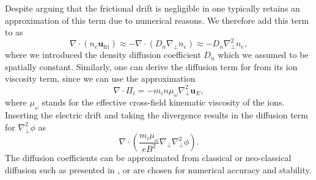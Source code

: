 Despite arguing that the frictional drift is negligible in  one typically retains an approximation of this term due to numerical reasons. We therefore add this term to  as 
\begin{equation}\label{diffusion}
	\nabla\cdot \left(n_e \textbf{u}_{\textrm{fri}}\right) \approx -\nabla\cdot \left(D_n\nabla_\perp n_e\right)\approx-D_n\nabla^2_\perp n_e,
\end{equation}
where we introduced the density diffusion coefficient $D_n$ which we assumed to be spatially constant. Similarly, one can derive the diffusion term for  from its ion viscosity term, since we can use the approximation
\begin{equation}
	\nabla\cdot \Pi_i = -m_in\mu_\omega\nabla_\perp^2\textbf{u}_E,
\end{equation}
where $\mu_\omega$ stands for the effective cross-field kinematic viscosity of the ions. Inserting the electric drift and taking the divergence results in the diffusion term for $\nabla_\perp^2\phi$ as
\begin{equation}
	\nabla\cdot\left(\frac{m_i \mu_\omega}{eB^2} \nabla_\perp\nabla_\perp^2\phi\right).
\end{equation}
The diffusion coefficients can be approximated from classical or neo-classical diffusion such as presented in \cite{fundamenski2007dissipative}, or are chosen for numerical accuracy and stability. 

